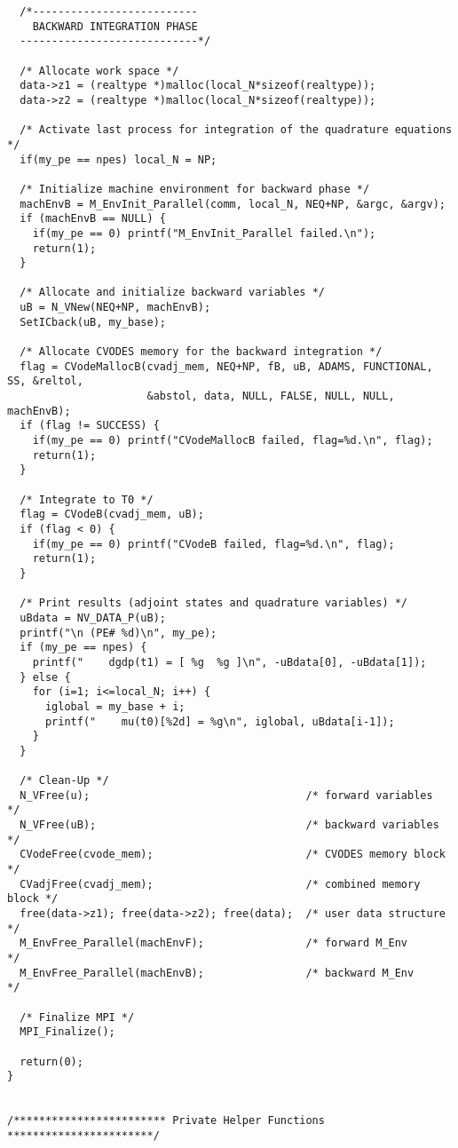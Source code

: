 \begin{verbatim}
  /*-------------------------- 
    BACKWARD INTEGRATION PHASE 
  ----------------------------*/

  /* Allocate work space */
  data->z1 = (realtype *)malloc(local_N*sizeof(realtype));
  data->z2 = (realtype *)malloc(local_N*sizeof(realtype));

  /* Activate last process for integration of the quadrature equations */
  if(my_pe == npes) local_N = NP;

  /* Initialize machine environment for backward phase */
  machEnvB = M_EnvInit_Parallel(comm, local_N, NEQ+NP, &argc, &argv);
  if (machEnvB == NULL) {
    if(my_pe == 0) printf("M_EnvInit_Parallel failed.\n"); 
    return(1);
  }

  /* Allocate and initialize backward variables */
  uB = N_VNew(NEQ+NP, machEnvB);
  SetICback(uB, my_base);

  /* Allocate CVODES memory for the backward integration */
  flag = CVodeMallocB(cvadj_mem, NEQ+NP, fB, uB, ADAMS, FUNCTIONAL, SS, &reltol, 
                      &abstol, data, NULL, FALSE, NULL, NULL, machEnvB);
  if (flag != SUCCESS) { 
    if(my_pe == 0) printf("CVodeMallocB failed, flag=%d.\n", flag);
    return(1);
  }

  /* Integrate to T0 */
  flag = CVodeB(cvadj_mem, uB);
  if (flag < 0) { 
    if(my_pe == 0) printf("CVodeB failed, flag=%d.\n", flag);
    return(1);
  }

  /* Print results (adjoint states and quadrature variables) */
  uBdata = NV_DATA_P(uB);
  printf("\n (PE# %d)\n", my_pe);
  if (my_pe == npes) {
    printf("    dgdp(t1) = [ %g  %g ]\n", -uBdata[0], -uBdata[1]);
  } else {
    for (i=1; i<=local_N; i++) {
      iglobal = my_base + i;
      printf("    mu(t0)[%2d] = %g\n", iglobal, uBdata[i-1]);
    }
  }

  /* Clean-Up */
  N_VFree(u);                                  /* forward variables     */
  N_VFree(uB);                                 /* backward variables    */
  CVodeFree(cvode_mem);                        /* CVODES memory block   */    
  CVadjFree(cvadj_mem);                        /* combined memory block */
  free(data->z1); free(data->z2); free(data);  /* user data structure   */
  M_EnvFree_Parallel(machEnvF);                /* forward M_Env         */
  M_EnvFree_Parallel(machEnvB);                /* backward M_Env        */
  
  /* Finalize MPI */
  MPI_Finalize();

  return(0);
}


/************************ Private Helper Functions ***********************/


\end{verbatim}
